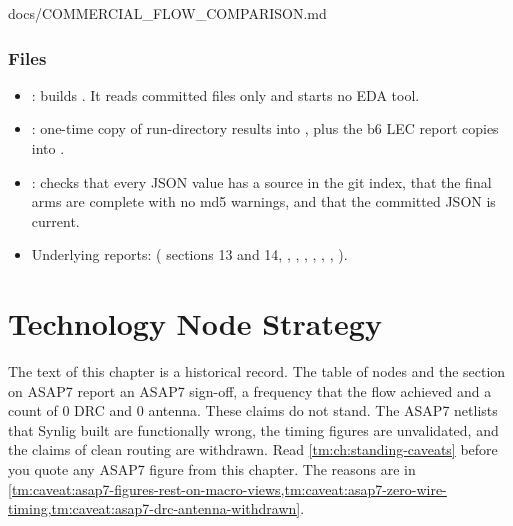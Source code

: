 \begin{relocated}{docs/COMMERCIAL_FLOW_COMPARISON.md}
\subsection{Files}\label{tm:pd:commercial-flow-comparison:8-files}

\begin{itemize}
\tightlist
\item
  : builds
  . It reads committed files only and starts no
  EDA tool.
\item
  : one-time copy of
  run-directory results into , plus the b6 LEC
  report copies into .
\item
  : checks that every JSON
  value has a source in the git index, that the final arms are complete
  with no md5 warnings, and that the committed JSON is current.
\item
  Underlying reports: 
  ( sections 13 and 14,
  , ,
  , ,
  , ,
  ).
\end{itemize}
\end{relocated}

\chapter{Technology Node Strategy}\label{tm:pd:node-strategy}

\begin{information}
The text of this chapter is a historical record. The table of nodes and the section on ASAP7 report an ASAP7 sign-off, a frequency that the flow achieved and a count of 0 DRC and 0 antenna. These claims do not stand. The ASAP7 netlists that Synlig built are functionally wrong, the timing figures are unvalidated, and the claims of clean routing are withdrawn. Read \cref{tm:ch:standing-caveats} before you quote any ASAP7 figure from this chapter. The reasons are in \cref{tm:caveat:asap7-figures-rest-on-macro-views,tm:caveat:asap7-zero-wire-timing,tm:caveat:asap7-drc-antenna-withdrawn}.
\end{information}

